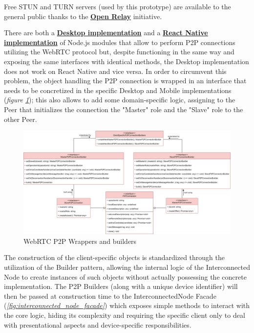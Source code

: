 Free STUN and TURN servers (used by this prototype) are available to the general public thanks to the \textbf{\href{https://www.metered.ca/tools/openrelay/}{Open Relay}} initiative.

There are both a \textbf{\href{https://www.npmjs.com/package/wrtc}{Desktop implementation}} and a \textbf{\href{https://www.npmjs.com/package/react-native-webrtc}{React Native implementation}} of Node.js modules that allow to perform P2P connections utilizing the WebRTC protocol but, despite functioning in the same way and exposing the same interfaces with identical methods, the Desktop implementation does not work on React Native and vice versa. In order to circumvent this problem, the object handling the P2P connection is wrapped in an interface that needs to be concretized in the specific Desktop and Mobile implementations (\textit{figure \ref{fig:p2p_wrapper}}); this also allows to add some domain-specific logic, assigning to the Peer that initializes the connection the "Master" role and the "Slave" role to the other Peer. 

\begin{figure}[!ht]
    \centering
    \includegraphics[width=\linewidth]{document/chapters/chapter_7/images/p2p_wrapper.png}
    \caption{WebRTC P2P Wrappers and builders}
    \label{fig:p2p_wrapper}
\end{figure}

The construction of the client-specific objects is standardized through the utilization of the Builder pattern, allowing the internal logic of the Interconnected Node to create instances of such objects without actually possessing the concrete implementation. The P2P Builders (along with a unique device identifier) will then be passed at construction time to the InterconnectedNode Facade (\textit{\ref{fig:interconnected_node_facade}}) which exposes simple methods to interact with the core logic, hiding its complexity and requiring the specific client only to deal with presentational aspects and device-specific responsibilities.


